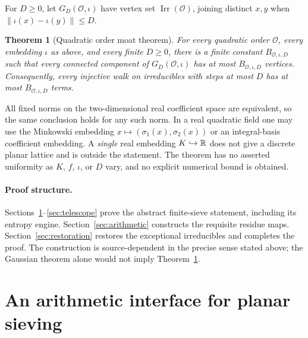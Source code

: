 \documentclass[11pt]{article}
\numberwithin{equation}{section}
\newtheorem{theorem}{Theorem}[section]
\theoremstyle{definition}\newtheorem{definition}[theorem]{Definition}
\theoremstyle{remark}\newtheorem{remark}[theorem]{Remark}
\newcommand{\OO}{\mathcal O}\newcommand{\PP}{\mathcal P}
\newcommand{\norm}[1]{\lVert #1\rVert}
\newcommand{\Irr}{\operatorname{Irr}}
\begin{document}
For $D\ge0$, let $G_D(\OO,\iota)$ have vertex set $\Irr(\OO)$, joining distinct $x,y$ when $\norm{\iota(x)-\iota(y)}\le D$.

\begin{theorem}[Quadratic order moat theorem]\label{thm:main}
For every quadratic order $\OO$, every embedding $\iota$ as above, and every finite $D\ge0$, there is a finite constant $B_{\OO,\iota,D}$ such that every connected component of $G_D(\OO,\iota)$ has at most $B_{\OO,\iota,D}$ vertices. Consequently, every injective walk on irreducibles with steps at most $D$ has at most $B_{\OO,\iota,D}$ terms.
\end{theorem}

All fixed norms on the two-dimensional real coefficient space are equivalent, so the same conclusion holds for any such norm. In a real quadratic field one may use the Minkowski embedding $x\mapsto(\sigma_1(x),\sigma_2(x))$ or an integral-basis coefficient embedding. A \emph{single} real embedding $K\hookrightarrow\mathbb R$ does not give a discrete planar lattice and is outside the statement. The theorem has no asserted uniformity as $K$, $f$, $\iota$, or $D$ vary, and no explicit numerical bound is obtained.

\paragraph{Proof structure.}
Sections~\ref{sec:interface}--\ref{sec:telescope} prove the abstract finite-sieve statement, including its entropy engine. Section~\ref{sec:arithmetic} constructs the requisite residue maps. Section~\ref{sec:restoration} restores the exceptional irreducibles and completes the proof. The construction is source-dependent in the precise sense stated above; the Gaussian theorem alone would not imply Theorem~\ref{thm:main}.

\section{An arithmetic interface for planar sieving}\label{sec:interface}
\end{document}
